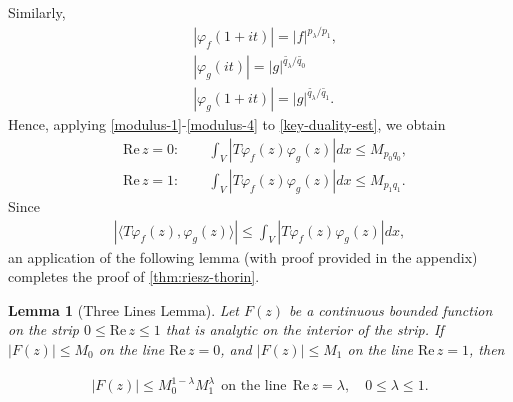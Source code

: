 \documentclass[12pt,reqno]{amsart}
\numberwithin{equation}{section}  %
\numberwithin{figure}{section}
\newcommand{\vp}{\varphi}
\theoremstyle{plain}
\newtheorem{lemma}{Lemma}
\theoremstyle{definition}
\theoremstyle{remark}
\begin{document}
%
%
Similarly,
%
%
\begin{align}
	\label{modulus-2}
	& | \vp_f(1 + it) | = | f |^{p_\lambda / p_1},
	\\
	\label{modulus-3}
	& | \vp_{g}(it) | = | g |^{\tilde{q_\lambda} / \tilde{q_0}}
	\\
	\label{modulus-4}
	& | \vp_{g}(1 + it) | = | g |^{\tilde{q_\lambda} / \tilde{q_1}}.
\end{align}
%
%
Hence, applying \eqref{modulus-1}-\eqref{modulus-4} to \eqref{key-duality-est},
we obtain
%
%
\begin{equation}
\label{bound-for-apply-3-line-lem}
\begin{split}
	& \text{Re}\,z = 0: \qquad \int_{V} | T \vp_{f}(z) \vp_{g}(z) | dx \le M_{p_0
	q_0},
	\\
	& \text{Re}\,z =1: \qquad \int_{V} | T \vp_{f}(z) \vp_{g}(z) | dx \le M_{p_1
	q_1}.
\end{split}
\end{equation}
%
%
Since
%
%
\begin{equation*}
\begin{split}
	|\langle T\vp_{f}(z), \vp_{g}(z) \rangle | \le \int_{V} | T \vp_{f}(z)
	\vp_{g}(z) | dx,
\end{split}
\end{equation*}
%
%
an application of the following lemma (with proof provided in the appendix)
completes the proof of \autoref{thm:riesz-thorin}. \qquad \qedsymbol
%
%
%
%
%
%
\begin{lemma}[Three Lines Lemma]
\label{lem:three-lines}
Let $F(z)$ be a continuous bounded function on the strip $0 \le \text{Re} \, z \le
1$ that is analytic on the interior of the strip. If $| F(z) | \le M_0$ on the
line $\text{Re}\, z=0$, and $| F(z) | \le M_1$ on the line $\text{Re}\, z=1$, then
\end{lemma}
%
%
%
%
\begin{equation}
\label{three-lines}
\begin{split}
	| F(z) | \le M_{0}^{1-\lambda} M_{1}^{\lambda} \ \ \text{on the line} \ \
	\text{Re}\,z=\lambda, \quad 0 \le \lambda \le 1.
\end{split}
\end{equation}
%
%
%
%
%
%
%
%
%
\end{document}
